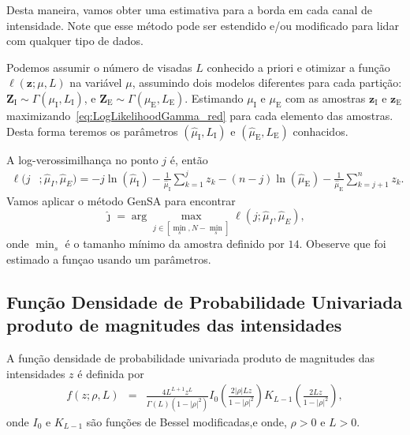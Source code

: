 Desta maneira, vamos obter uma estimativa para a borda em cada canal de intensidade.
Note que esse método pode ser estendido e/ou modificado para lidar com qualquer tipo de dados.

Podemos assumir o número de visadas $L$ conhecido a priori e otimizar a função $ \ell(\bm z;\mu, L)$ na variável $\mu$, assumindo dois modelos diferentes para cada partição:
$\bm Z_\text{I} \sim \Gamma(\mu_\text{I},L_\text{I})$, e
$\bm Z_\text{E} \sim \Gamma(\mu_\text{E},L_\text{E})$.
Estimando $\mu_\text{I}$ e $\mu_\text{E}$ com as amostras $\bm z_\text{I}$ e $\bm z_\text{E}$ maximizando~\eqref{eq:LogLikelihoodGamma_red} para cada elemento das amostras. Desta forma teremos os parâmetros $(\widehat{\mu}_\text{I}, L_\text{I})$ e $(\widehat{\mu}_\text{E}, L_\text{E})$ conhacidos.

A log-verossimilhança no ponto $j$ é, então
\begin{equation}\label{eq:TotalLogLikelihood_L_fixo}
\begin{split}
\ell(j&;\widehat{\mu}_I,\widehat{\mu}_E)= 
 -j\ln (\widehat{\mu}_\text{I}) 
- \frac{1}{\widehat{\mu}_\text{I}}\sum_{k=1}^{j} z_k -(n-j)\ln (\widehat{\mu}_\text{E})
- \frac{1}{\widehat{\mu}_\text{E}}\sum_{k=j+1}^{n} z_k.
\end{split}
\end{equation}
Vamos aplicar o método GenSA para encontrar
$$
\widehat{\jmath}= \arg\max\limits_{j\in [\min_s,N-\min_s]}\ell(j;\widehat{\mu}_I,\widehat{\mu}_E),
$$ 
onde $\min_s$ é o tamanho mínimo da amostra definido por $14$. Obeserve que foi estimado a funçao usando um parâmetros.

\subsection{Função Densidade de Probabilidade Univariada produto de magnitudes das intensidades}

A  função densidade de probabilidade univariada produto de magnitudes das intensidades $z$ é definida por
\begin{equation}\label{eq:pdf_mag_prod}
\begin{array}{lcl}
	f(z;\rho, L)&=&\frac{4L^{L+1}z^L}{\Gamma(L)(1-|\rho|^2)}I_0\left(\frac{2|\rho|Lz}{1-|\rho|^2}\right)K_{L-1}\left(\frac{2Lz}{1-|\rho|^2}\right),
		\end{array}
\end{equation}
onde $I_0$ e $K_{L-1}$ são funções de Bessel modificadas,e onde, $\rho>0$ e $L>0$.


